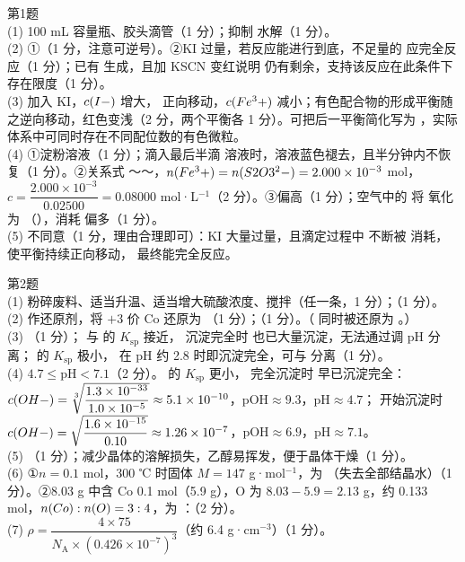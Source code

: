 \begin{jiexilist}
\item 第1题\\
(1) 100 mL 容量瓶、胶头滴管（1 分）；抑制  水解（1 分）。\\
(2) ①（1 分，注意可逆号）。②KI 过量，若反应能进行到底，不足量的  应完全反应（1 分）；已有  生成，且加 KSCN 变红说明  仍有剩余，支持该反应在此条件下存在限度（1 分）。\\
(3) 加入 KI，$c(I-)$ 增大， 正向移动，$c(Fe^3+)$ 减小；有色配合物的形成平衡随之逆向移动，红色变浅（2 分，两个平衡各 1 分）。可把后一平衡简化写为 ，实际体系中可同时存在不同配位数的有色微粒。\\
(4) ①淀粉溶液（1 分）；滴入最后半滴  溶液时，溶液蓝色褪去，且半分钟内不恢复（1 分）。②关系式 ～～，$n(Fe^3+)=n(S2O3^2-)=2.000\times10^{-3}$ mol，$c=\dfrac{2.000\times10^{-3}}{0.02500}=0.08000$ mol·L$^{-1}$（2 分）。③偏高（1 分）；空气中的  将  氧化为 （），消耗  偏多（1 分）。\\
(5) 不同意（1 分，理由合理即可）：KI 大量过量，且滴定过程中  不断被  消耗，使平衡持续正向移动， 最终能完全反应。

\item 第2题\\
(1) 粉碎废料、适当升温、适当增大硫酸浓度、搅拌（任一条，1 分）；（1 分）。\\
(2) 作还原剂，将 $+3$ 价 Co 还原为 （1 分）；（1 分）。（ 同时被还原为 。）\\
(3) （1 分）； 与  的 $K_\text{sp}$ 接近， 沉淀完全时  也已大量沉淀，无法通过调 pH 分离； 的 $K_\text{sp}$ 极小， 在 pH 约 2.8 时即沉淀完全，可与  分离（1 分）。\\
(4) $4.7\le$pH$<7.1$（2 分）。 的 $K_\text{sp}$ 更小， 完全沉淀时  早已沉淀完全：$c(OH-)=\sqrt[3]{\dfrac{1.3\times10^{-33}}{1.0\times10^{-5}}}\approx5.1\times10^{-10}$，pOH$\approx9.3$，pH$\approx4.7$； 开始沉淀时 $c(OH-)=\sqrt{\dfrac{1.6\times10^{-15}}{0.10}}\approx1.26\times10^{-7}$，pOH$\approx6.9$，pH$\approx7.1$。\\
(5) （1 分）；减少晶体的溶解损失，乙醇易挥发，便于晶体干燥（1 分）。\\
(6) ①$n=0.1$ mol，300 ℃ 时固体 $M=147$ g·mol$^{-1}$，为 （失去全部结晶水）（1 分）。②8.03 g 中含 Co 0.1 mol（5.9 g），O 为 $8.03-5.9=2.13$ g，约 0.133 mol，$n(Co):n(O)=3:4$，为 ：（2 分）。\\
(7) $\rho=\dfrac{4\times75}{N_\text{A}\times(0.426\times10^{-7})^3}$（约 6.4 g·cm$^{-3}$）（1 分）。


\end{jiexilist}
